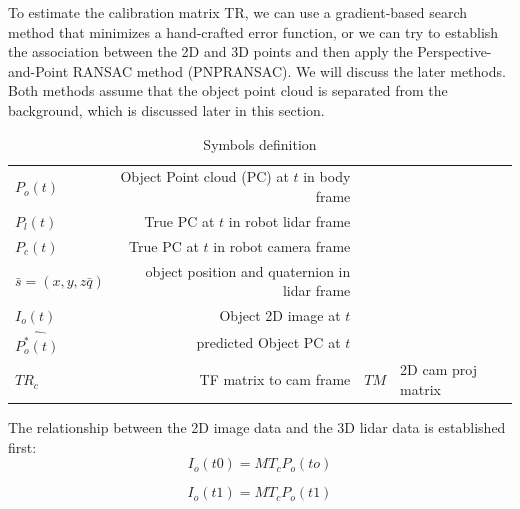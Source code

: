 \documentclass[journal]{IEEEtran}
\begin{document}
To estimate the calibration matrix TR, we can use a gradient-based search method that minimizes a hand-crafted error function, or we can try to establish the association between the 2D and 3D points and then apply the Perspective-and-Point RANSAC method (PNPRANSAC). We will discuss the later methods. Both methods assume that the object point cloud is separated from the background, which is discussed later in this section.
\begin{table}
    \caption{Symbols definition}
    \label{mysymbls}
        \begin{tabularx}{0.9\textwidth}{l | r}
        $P_o(t)$ & Object Point cloud (PC) at $t$ in  body frame  \\
        $P_l(t)$ & True PC at $t$  in robot lidar frame  \\
        $P_c(t)$ & True PC at $t$  in robot camera frame  \\
        $\bar{s}=(x,y,z \bar{q}) $ & object position and quaternion in lidar frame \\
         $I_o(t)$ & Object 2D image at $t$  \\
        $\hat{P_o^*(t)}$ & predicted Object PC at $t$  \\
        $TR_c$  &  TF matrix to cam frame & $TM$ &  2D cam proj matrix \\
\end{tabularx}
\end{table}

The relationship between the 2D image data and the 3D lidar data is established first:
\begin{equation}\label{eq:i0}
I_o(t0) = M T_c P_o (to) 
\end{equation}

\begin{equation}\label{eq:i1}
I_o(t1) = M T_c P_o (t1) 
\end{equation}
\end{document}
